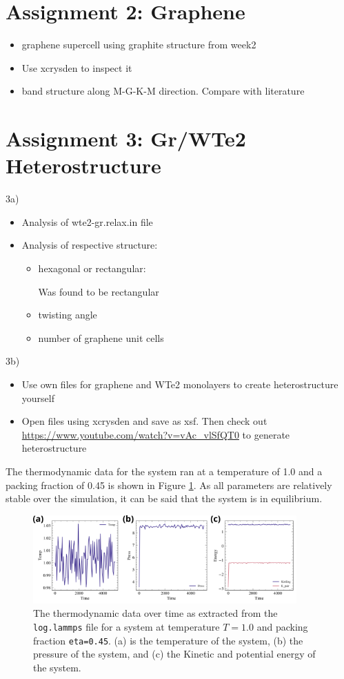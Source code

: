 \documentclass[10pt,a4paper]{labreport}
\begin{document}
\newpage
\section{Assignment 2: Graphene}
\begin{itemize}
  \item graphene supercell using graphite structure from week2
  \item Use xcrysden to inspect it
  \item band structure along M-G-K-M direction. Compare with literature 
\end{itemize}


\section{Assignment 3: Gr/WTe2 Heterostructure}
3a)
\begin{itemize}
  \item Analysis of wte2-gr.relax.in file
  \item Analysis of respective structure:
  \begin{itemize}
    \item hexagonal or rectangular: 
    
    Was found to be rectangular 
    \item twisting angle
    \item number of graphene unit cells
  \end{itemize}
\end{itemize}

3b)
\begin{itemize}
  \item Use own files for graphene and WTe2 monolayers to create heterostructure yourself
  \item Open files using xcrysden and save as xsf. Then check out \url{https://www.youtube.com/watch?v=vAc_vlSfQT0} to generate heterostructure 
\end{itemize}


The thermodynamic data for the system ran at a temperature of 1.0 and a packing fraction of 0.45 is shown in Figure \ref{fig:ass3_thermo}. As all parameters are relatively stable over the simulation, it can be said that the system is in equilibrium. 

\begin{figure}[htpb]
  \centering 
  \includegraphics[width = 0.9\textwidth]{figs/ass3_thermo.png}
  \caption{The thermodynamic data over time as extracted from the \texttt{log.lammps} file for a system at temperature $T=1.0$ and packing fraction \texttt{eta=0.45}. (a) is the temperature of the system, (b) the pressure of the system, and (c) the Kinetic and potential energy of the system.}
  \label{fig:ass3_thermo}
\end{figure}
\end{document}
